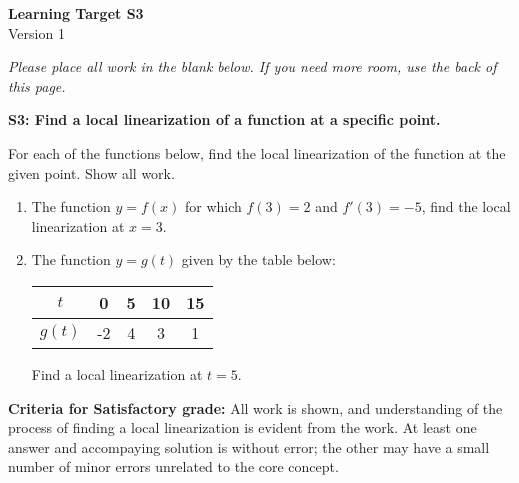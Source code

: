 \documentclass[10pt]{article}
\begin{document}
	\vspace*{0in}

		\begin{center}
			\textbf{Learning Target S3} \\
			{Version 1} \\
		\end{center}

\emph{Please place all work in the blank below. If you need more room, use the back of this page.}

\begin{framed}
	\textbf{S3: Find a local linearization of a function at a specific point.}
\end{framed}

For each of the functions below, find the local linearization of the function at the given point. Show all work. 

\begin{enumerate}
    \item The function $y = f(x)$ for which $f(3) = 2$ and $f'(3) = -5$, find the local linearization at $x=3$.
    
    \item The function $y = g(t)$ given by the table below: 
    \begin{center}
            \begin{tabular}{c||c|c|c|c|}
        $t$ &  0 & 5 & 10 & 15  \\ \hline 
        $g(t)$ & -2 & 4 & 3 & 1 
    \end{tabular}
    \end{center}
    Find a local linearization at $t = 5$. 

    
    
\end{enumerate}



\vfill


\begin{small}
    \begin{framed}
        	\textbf{Criteria for Satisfactory grade:} All work is shown, and understanding of the process of finding a local linearization is evident from the work. At least one answer and accompaying solution is without error; the other may have a small number of minor errors unrelated to the core concept. 
    \end{framed}

\end{small}
\end{document}
